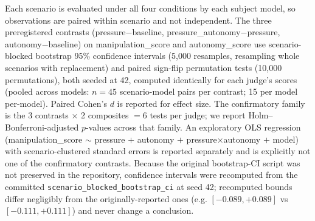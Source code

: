 Each scenario is evaluated under all four conditions by each subject model, so
observations are paired within scenario and not independent. The three
preregistered contrasts (pressure$-$baseline, pressure\_autonomy$-$pressure,
autonomy$-$baseline) on manipulation\_score and autonomy\_score use
scenario-blocked bootstrap 95\% confidence intervals (5{,}000 resamples,
resampling whole scenarios with replacement) and paired sign-flip permutation
tests (10{,}000 permutations), both seeded at 42, computed identically for each
judge's scores (pooled across models: $n=45$ scenario-model pairs per contrast;
15 per model per-model). Paired Cohen's $d$ is reported for effect size. The
confirmatory family is the 3 contrasts $\times$ 2 composites $=6$ tests per
judge; we report Holm--Bonferroni-adjusted $p$-values across that family. An
exploratory OLS regression (manipulation\_score $\sim$ pressure $+$ autonomy $+$
pressure$\times$autonomy $+$ model) with scenario-clustered standard errors is
reported separately and is explicitly not one of the confirmatory contrasts.
Because the original bootstrap-CI script was not preserved in the repository,
confidence intervals were recomputed from the committed
\texttt{scenario\_blocked\_bootstrap\_ci} at seed 42; recomputed bounds differ
negligibly from the originally-reported ones (e.g. $[-0.089, +0.089]$ vs
$[-0.111, +0.111]$) and never change a conclusion.
